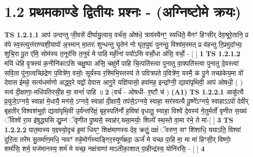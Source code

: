 \documentclass[17pt]{extarticle}
\begin{document}
     \section*{ 1.2     प्रथमकाण्डे द्वितीयः प्रश्नः - (अग्निष्टोमे क्रयः) }
                                        \textbf{ TS 1.2.1.1} \newline
                  आप॑ उन्दन्तु जी॒वसे॑ दीर्घायु॒त्वाय॒ वर्च॑स॒ ओष॑धे॒ त्राय॑स्वैनꣳ॒॒ स्वधि॑ते॒ मैनꣳ॑ हिꣳसीर् देव॒श्रूरे॒तानि॒ प्र व॑पे स्व॒स्त्युत्त॑राण्यशी॒यापो॑ अ॒स्मान् मा॒तरः॑ शुन्धन्तु घृ॒तेन॑ नो घृत॒पुवः॑ पुनन्तु॒ विश्व॑म॒स्मत् प्र व॑हन्तु रि॒प्रमुदा᳚भ्यः॒ शुचि॒रा पू॒त ए॑मि॒ सोम॑स्य त॒नूर॑सि त॒नुवं॑ मे पाहि मही॒नां पयो॑ऽसि वर्चो॒धा अ॑सि॒ वर्चो॒ - [ ] \textbf{  1} \newline
                  \newline
                                \textbf{ TS 1.2.1.2} \newline
                  मयि॑ धेहि वृ॒त्रस्य॑ क॒नीनि॑काऽसि चक्षु॒ष्पा अ॑सि॒ चक्षु॑र्मे पाहि चि॒त्पति॑स्त्वा पुनातु वा॒क्पति॑स्त्वा पुनातु दे॒वस्त्वा॑ सवि॒ता पु॑ना॒त्वच्छि॑द्रेण प॒वित्रे॑ण॒ वसोः॒ सूर्य॑स्य र॒श्मिभि॒स्तस्य॑ ते पवित्रपते प॒वित्रे॑ण॒ यस्मै॒ कं पु॒ने तच्छ॑केय॒मा वो॑ देवास ईमहे॒ सत्य॑धर्माणो अद्ध्व॒रे यद्वो॑ देवास आगु॒रे यज्ञि॑यासो॒ हवा॑मह॒ इन्द्रा᳚ग्नी॒ द्यावा॑पृथिवी॒ आप॑ ओषधी॒ ( ) स्त्वं दी॒क्षाणा॒-मधि॑पतिरसी॒ह मा॒ सन्तं॑ पाहि ॥ \textbf{  2 } \newline
                  \newline
                      (वर्च॑ - ओषधी- र॒ष्टौ च॑ )  \textbf{(A1)} \newline \newline
                                        \textbf{ TS 1.2.2.1} \newline
                  आकू᳚त्यै प्र॒युजे॒ऽग्नये॒ स्वाहा॑ मे॒धायै॒ मन॑से॒ ऽग्नये॒ स्वाहा॑ दी॒क्षायै॒ तप॑से॒ऽग्नये॒ स्वाहा॒ सर॑स्वत्यै पू॒ष्णे᳚ऽग्नये॒ स्वाहाऽऽपो॑ देवीर् बृहतीर् विश्वशंभुवो॒ द्यावा॑पृथि॒वी उ॒र्व॑न्तरि॑क्षं॒ बृह॒स्पति॑र्नो ह॒विषा॑ वृधातु॒ स्वाहा॒ विश्वे॑ दे॒वस्य॑ ने॒तुर्मर्तो॑ वृणीत स॒ख्यं ॅविश्वे॑ रा॒य इ॑षुद्ध्यसि द्यु॒म्नं ॅवृ॑णीत पु॒ष्यसे॒ स्वाह॑र्.ख्सा॒मयोः॒ शिल्पे᳚ स्थ॒स्ते वा॒मा र॑भे॒ ते मा॑-[ ] \textbf{  3} \newline
                  \newline
                                \textbf{ TS 1.2.2.2} \newline
                  पात॒मास्य य॒ज्ञ्स्यो॒दृच॑ इ॒मां धियꣳ॒॒ शिक्ष॑माणस्य देव॒ क्रतुं॒ दक्षं॑ ॅवरुण॒ सꣳ शि॑शाधि॒ ययाऽति॒ विश्वा॑ दुरि॒ता तरे॑म सु॒तर्मा॑ण॒मधि॒ नावꣳ॑ रुहे॒मोर्ग॑स्याङ्गिर॒स्यूर्ण॑म्रदा॒ ऊर्जं॑ मे यच्छ पा॒हि मा॒ मा मा॑ हिꣳसी॒र् विष्णोः॒ शर्मा॑सि॒ शर्म॒ यज॑मानस्य॒ शर्म॑ मे यच्छ॒ नक्ष॑त्राणां माऽतीका॒शात् पा॒हीन्द्र॑स्य॒ योनि॑रसि॒ - [ ] \textbf{  4} \newline
\end{document}

